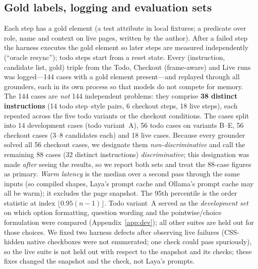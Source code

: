 \documentclass[11pt,a4paper]{article}
\begin{document}
\subsection{Gold labels, logging and evaluation sets}\label{sec:protocol}
Each step has a gold element (a test attribute in local fixtures; a predicate over role, name and context on live pages, written by the author). After a failed step the harness executes the gold element so later steps are measured independently (``oracle resync''); todo steps start from a reset state. Every (instruction, candidate list, gold) triple from the Todo, Checkout (frame-aware) and Live runs was logged---144 cases with a gold element present---and replayed through all grounders, each in its own process so that models do not compete for memory. The 144 cases are \emph{not} 144 independent problems: they comprise \textbf{38 distinct instructions} (14 todo step--style pairs, 6 checkout steps, 18 live steps), each repeated across the five todo variants or the checkout conditions. The cases split into 14 development cases (todo variant~A), 56 todo cases on variants B--E, 56 checkout cases (3--8 candidates each) and 18 live cases. Because every grounder solved all 56 checkout cases, we designate them \emph{non-discriminative} and call the remaining 88 cases (32 distinct instructions) \emph{discriminative}; this designation was made \emph{after} seeing the results, so we report both sets and treat the 88-case figures as primary. \emph{Warm latency} is the median over a second pass through the same inputs (so compiled shapes, Laya's prompt cache and Ollama's prompt cache may all be warm); it excludes the page snapshot. The 95th percentile is the order statistic at index $\lfloor0.95(n-1)\rfloor$. Todo variant~A served as the \emph{development set} on which option formatting, question wording and the pointwise/choice formulation were compared (Appendix~\ref{app:dev}); all other suites are held out for those choices. We fixed two harness defects after observing live failures (CSS-hidden native checkboxes were not enumerated; one check could pass spuriously), so the live suite is not held out with respect to the snapshot and its checks; these fixes changed the snapshot and the check, not Laya's prompts.
\end{document}
